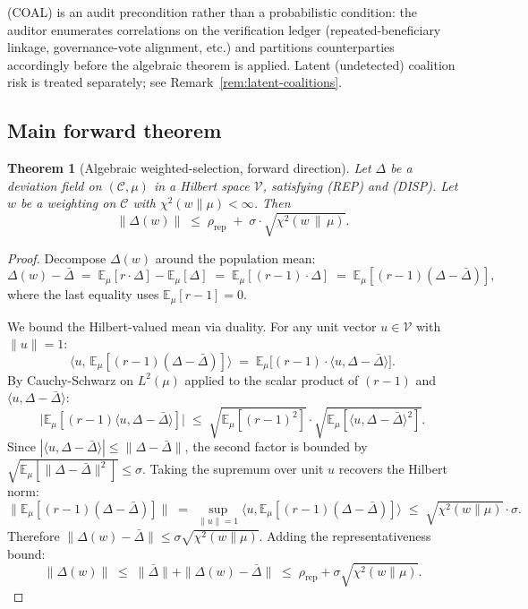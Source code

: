 \documentclass{article}
\newtheorem{theorem}{Theorem}
\newcommand{\chisq}{\chi^2}
\begin{document}
(COAL) is an audit precondition rather than a probabilistic
condition: the auditor enumerates correlations on the verification
ledger (repeated-beneficiary linkage, governance-vote alignment,
etc.) and partitions counterparties accordingly before the
algebraic theorem is applied.  Latent (undetected) coalition
risk is treated separately; see Remark~\ref{rem:latent-coalitions}.

\subsection{Main forward theorem}

\begin{theorem}[Algebraic weighted-selection, forward direction]
\label{thm:forward-v2}
Let $\Delta$ be a deviation field on $(\mathcal{C}, \mu)$ in a
Hilbert space $\mathcal{V}$, satisfying (REP) and (DISP).  Let $w$
be a weighting on $\mathcal{C}$ with $\chisq(w \|\mu) < \infty$.
Then
\begin{equation}
\label{eq:forward-bound-v2}
  \|\Delta(w)\| \;\leq\; \rho_\mathrm{rep} \;+\;
  \sigma \cdot \sqrt{\chisq(w \,\|\, \mu)}.
\end{equation}
\end{theorem}

\begin{proof}
Decompose $\Delta(w)$ around the population mean:
\[
  \Delta(w) - \bar\Delta \;=\; \mathbb{E}_\mu[r \cdot \Delta]
  - \mathbb{E}_\mu[\Delta] \;=\; \mathbb{E}_\mu[(r - 1) \cdot \Delta]
  \;=\; \mathbb{E}_\mu[(r - 1)(\Delta - \bar\Delta)],
\]
where the last equality uses $\mathbb{E}_\mu[r - 1] = 0$.

We bound the Hilbert-valued mean via duality.  For any unit vector
$u \in \mathcal{V}$ with $\|u\| = 1$:
\[
  \big\langle u, \,\mathbb{E}_\mu[(r - 1)(\Delta - \bar\Delta)] \big\rangle
  \;=\; \mathbb{E}_\mu\big[(r - 1) \cdot \langle u, \Delta - \bar\Delta\rangle\big].
\]
By Cauchy-Schwarz on $L^2(\mu)$ applied to the scalar product of
$(r - 1)$ and $\langle u, \Delta - \bar\Delta\rangle$:
\[
  \big|\mathbb{E}_\mu[(r-1) \langle u, \Delta - \bar\Delta\rangle]\big|
  \;\leq\; \sqrt{\mathbb{E}_\mu[(r-1)^2]} \cdot
  \sqrt{\mathbb{E}_\mu[\langle u, \Delta - \bar\Delta\rangle^2]}.
\]
Since $|\langle u, \Delta - \bar\Delta\rangle| \leq \|\Delta -
\bar\Delta\|$, the second factor is bounded by
$\sqrt{\mathbb{E}_\mu[\|\Delta - \bar\Delta\|^2]} \leq \sigma$.
Taking the supremum over unit $u$ recovers the Hilbert norm:
\[
  \|\mathbb{E}_\mu[(r-1)(\Delta - \bar\Delta)]\|
  \;=\; \sup_{\|u\|=1} \big\langle u, \mathbb{E}_\mu[(r-1)(\Delta - \bar\Delta)]\big\rangle
  \;\leq\; \sqrt{\chisq(w \|\mu)} \cdot \sigma.
\]
Therefore $\|\Delta(w) - \bar\Delta\| \leq \sigma \sqrt{\chisq(w
\|\mu)}$.  Adding the representativeness bound:
\[
  \|\Delta(w)\| \;\leq\; \|\bar\Delta\| + \|\Delta(w) - \bar\Delta\|
  \;\leq\; \rho_\mathrm{rep} + \sigma \sqrt{\chisq(w \|\mu)}.
\]
\end{proof}
\end{document}
